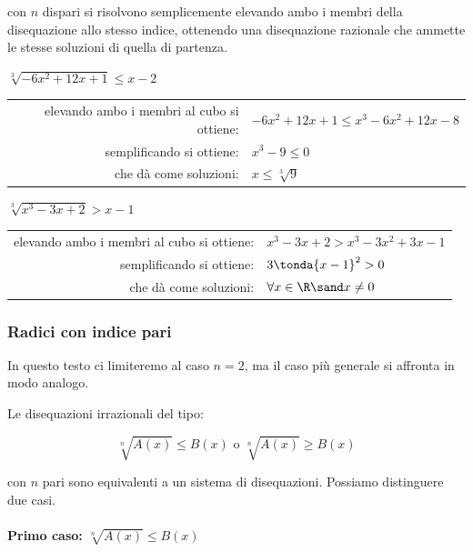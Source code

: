con \(n\) dispari si risolvono semplicemente elevando ambo i membri della 
disequazione allo stesso indice, ottenendo una disequazione razionale che 
ammette le stesse soluzioni di quella di partenza.

\begin{esempio}
\(\sqrt[3]{-6x^2 +12x +1} \leqslant x -2\)
\begin{center} \begin{tabular}{rl}
elevando ambo i membri al cubo si ottiene: & 
\(-6x^2 +12x +1 \leqslant x^3 -6x^2 +12x -8\)\\
semplificando si ottiene: & \(x^3 -9 \leqslant 0\)\\
che dà come soluzioni: & \(x \leqslant \sqrt[3]{9}\)
\end{tabular} \end{center}
\end{esempio}

\begin{esempio}
\(\sqrt[3]{x^3 -3x +2} > x -1\)
\begin{center} \begin{tabular}{rl}
elevando ambo i membri al cubo si ottiene: & 
\(x^3 -3x +2 > x^3 -3x^2 +3x -1\)\\
semplificando si ottiene: & \(3 \tonda{x -1}^2 > 0\)\\
che dà come soluzioni: & \(\forall x \in \R \sand x \neq 0\) 
\end{tabular} \end{center} 
\end{esempio}

\subsubsection{Radici con indice pari}

In questo testo ci limiteremo al caso \(n=2\), ma il caso più 
generale si affronta in modo analogo.

Le disequazioni irrazionali del tipo:

\[\sqrt[n]{A(x)} \leqslant B(x) \text{ o } \sqrt[n]{A(x)} \geqslant B(x)\]

con \(n\) pari sono equivalenti a un sistema di disequazioni. Possiamo 
distinguere due casi.

\paragraph{Primo caso: \(\sqrt[n]{A(x)} \leqslant B(x)\)}
~

